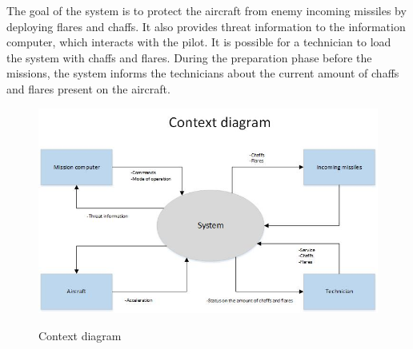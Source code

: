 The goal of the system is to protect the aircraft from enemy incoming missiles by deploying flares and chaffs. It also provides threat information to the information computer, which interacts with the pilot. 
It is possible for a technician to load the system with chaffs and flares. During the preparation phase before the missions, the system informs the technicians about the current amount of chaffs and flares present on the aircraft.
\begin{figure}[h]
	\centering
	\includegraphics[scale=0.55]{./images/Systemoverview}\\
	\caption{Context diagram}
    \label{fig:Context diagram}
\end{figure}